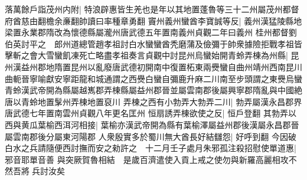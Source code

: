 落萬餘戶詣茂州内附|{
	特浪辟惠皆生羌也是年以其地置蓬魯等三十二州屬茂州都督府酋慈由翻檐余亷翻帥讀曰率種章勇翻}
竇州義州蠻酋李寶誠等反|{
	義州漢猛陵縣地梁置永業郡隋改為懷德縣屬瀧州唐武德五年置南義州貞觀二年曰義州}
桂州都督劉伯英討平之　郎州道總管趙孝祖討白水蠻蠻酋秃磨蒲及儉彌于帥衆據險拒戰孝祖皆擊斬之會大雪蠻飢凍死亡略盡孝祖奏言貞觀中討昆州烏蠻始開青蛉弄棟為州縣|{
	昆州漢益州郡地隋置昆州以亂廢唐武德初開南中復置柘東兩㸑蠻自曲州靖州西南昆川曲軛晉寧喻獻安寧距龍和城通謂之西㸑白蠻自彌鹿升麻二川南至步頭謂之東㸑烏蠻青蛉漢武帝開為縣屬越嶲郡弄棟縣屬益州郡晉並屬雲南郡後屬興寧郡隋亂與中國絶唐以青蛉地置髳州弄棟地置裒川}
弄棟之西有小勃弄大勃弄二川|{
	勃弄屬漢永昌郡界唐武德七年置南雲州貞觀八年更名匡州}
恒扇誘弄棟欲使之反|{
	恒戶登翻}
其勃弄以西與黄瓜葉榆西洱河相接|{
	葉榆亦漢武帝開為縣有葉榆澤屬益州郡後漢屬永昌郡晉屬雲南郡後分屬東河陽郡}
人衆殷實多於蜀川無大酋長好結讎怨|{
	好呼到翻}
今因破白水之兵請隨便西討撫而安之勑許之　十二月壬子處月朱邪孤注殺招慰使單道惠|{
	邪音耶單音善}
與突厥賀魯相結　是歲百濟遣使入貢上戒之使勿與新羅高麗相攻不然吾將兵討汝矣

